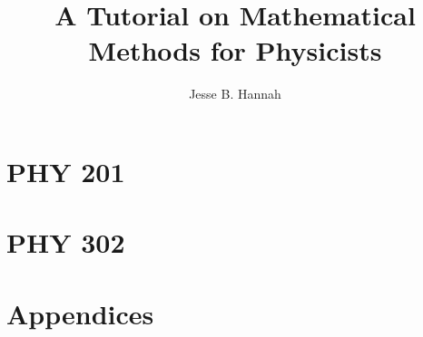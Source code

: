 \documentclass{book}
\begin{document}
\frontmatter

\title{A Tutorial on Mathematical Methods for Physicists}
\author{Jesse B. Hannah}
\date{}

\maketitle



\tableofcontents





\mainmatter

\part{PHY 201}









\part{PHY 302}










\appendix
\cleardoublepage
{}
{}
\part*{Appendices}



\nocite{*}


\cleardoublepage
{}
{}

\end{document}
